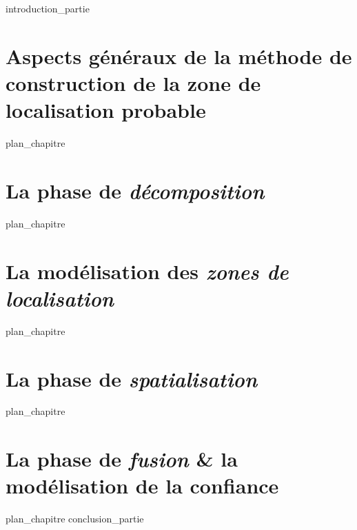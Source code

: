 \label{part:02_int}
{introduction_partie}
%
\chapter{Aspects généraux de la méthode de construction de la zone de
  localisation probable }
\label{chap:04}
{plan_chapitre}
%
\chapter{La phase de \emph{décomposition} }
\label{chap:05}
{plan_chapitre}
%
\chapter{La modélisation des \emph{zones de localisation}}
\label{chap:06}
{plan_chapitre}
%
\chapter{La phase de \emph{spatialisation} }
\label{chap:07}
{plan_chapitre}
%
\chapter{La phase de \emph{fusion} \& la modélisation de la confiance
  }
\label{chap:08}
{plan_chapitre}
%
\label{part:02_cnc}
{conclusion_partie}
